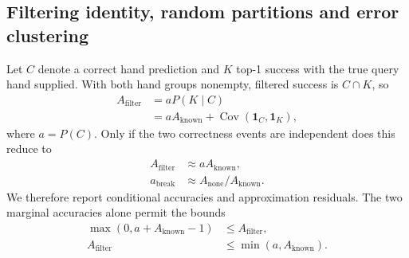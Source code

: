 \documentclass[ASNA,twocolumn]{USG}
\begin{document}
\subsection{Filtering identity, random partitions and error clustering}
\label{sec:identity}
Let $C$ denote a correct hand prediction and $K$ top-1 success with the true query hand supplied. With both hand groups nonempty, filtered success is $C\cap K$, so
\begin{align}
 A_{\mathrm{filter}}&=aP(K\mid C)\nonumber\\
 &=aA_{\mathrm{known}}+\operatorname{Cov}(\mathbf1_C,\mathbf1_K),
 \label{eq:exact}
\end{align}
where $a=P(C)$. Only if the two correctness events are independent does this reduce to
\begin{equation}
 \begin{aligned}
 A_{\mathrm{filter}}&\approx aA_{\mathrm{known}},\\
 a_{\mathrm{break}}&\approx A_{\mathrm{none}}/A_{\mathrm{known}}.
 \end{aligned}
 \label{eq:approx}
\end{equation}
We therefore report conditional accuracies and approximation residuals. The two marginal accuracies alone permit the bounds
\begin{equation}
 \begin{aligned}
 \max(0,a+A_{\mathrm{known}}-1)&\leq A_{\mathrm{filter}},\\
 A_{\mathrm{filter}}&\leq\min(a,A_{\mathrm{known}}).
 \end{aligned}
 \label{eq:bounds}
\end{equation}
\end{document}
